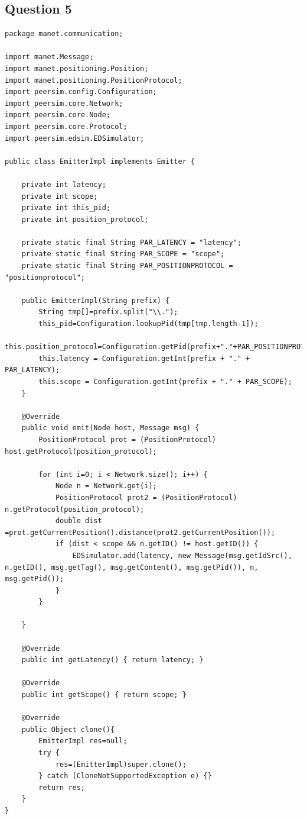 \documentclass[a4paper]{article}
\begin{document}
\subsection{Question 5}
\begin{verbatim}
package manet.communication;

import manet.Message;
import manet.positioning.Position;
import manet.positioning.PositionProtocol;
import peersim.config.Configuration;
import peersim.core.Network;
import peersim.core.Node;
import peersim.core.Protocol;
import peersim.edsim.EDSimulator;

public class EmitterImpl implements Emitter {

    private int latency;
    private int scope;
    private int this_pid;
    private int position_protocol;

    private static final String PAR_LATENCY = "latency";
    private static final String PAR_SCOPE = "scope";
    private static final String PAR_POSITIONPROTOCOL = "positionprotocol";

    public EmitterImpl(String prefix) {
        String tmp[]=prefix.split("\\.");
        this_pid=Configuration.lookupPid(tmp[tmp.length-1]);
        this.position_protocol=Configuration.getPid(prefix+"."+PAR_POSITIONPROTOCOL);
        this.latency = Configuration.getInt(prefix + "." + PAR_LATENCY);
        this.scope = Configuration.getInt(prefix + "." + PAR_SCOPE);
    }

    @Override
    public void emit(Node host, Message msg) {
        PositionProtocol prot = (PositionProtocol) host.getProtocol(position_protocol);

        for (int i=0; i < Network.size(); i++) {
            Node n = Network.get(i);
            PositionProtocol prot2 = (PositionProtocol) n.getProtocol(position_protocol);
            double dist =prot.getCurrentPosition().distance(prot2.getCurrentPosition());
            if (dist < scope && n.getID() != host.getID()) {
                EDSimulator.add(latency, new Message(msg.getIdSrc(), n.getID(), msg.getTag(), msg.getContent(), msg.getPid()), n, msg.getPid());
            }
        }

    }

    @Override
    public int getLatency() { return latency; }

    @Override
    public int getScope() { return scope; }

    @Override
    public Object clone(){
        EmitterImpl res=null;
        try {
            res=(EmitterImpl)super.clone();
        } catch (CloneNotSupportedException e) {}
        return res;
    }
}
\end{verbatim}
\end{document}
